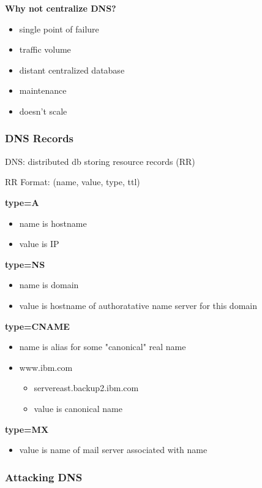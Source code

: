 \documentclass[11pt]{article}
\begin{document}
\textbf{Why not centralize DNS?}
\begin{itemize}
\item single point of failure
\item traffic volume
\item distant centralized database
\item maintenance
\item doesn't scale
\end{itemize}

\subsubsection{DNS Records}
\label{sec:orgc19003c}

DNS: distributed db storing resource records (RR) 

RR Format: (name, value, type, ttl)

\textbf{type=A}
\begin{itemize}
\item name is hostname
\item value is IP
\end{itemize}

\textbf{type=NS}
\begin{itemize}
\item name is domain
\item value is hostname of authoratative name server for this domain
\end{itemize}

\textbf{type=CNAME}
\begin{itemize}
\item name is alias for some "canonical" real name
\item www.ibm.com
\begin{itemize}
\item servereast.backup2.ibm.com
\item value is canonical name
\end{itemize}
\end{itemize}

\textbf{type=MX}
\begin{itemize}
\item value is name of mail server associated with name
\end{itemize}


\subsubsection{Attacking DNS}
\label{sec:org5c24272}
\end{document}
